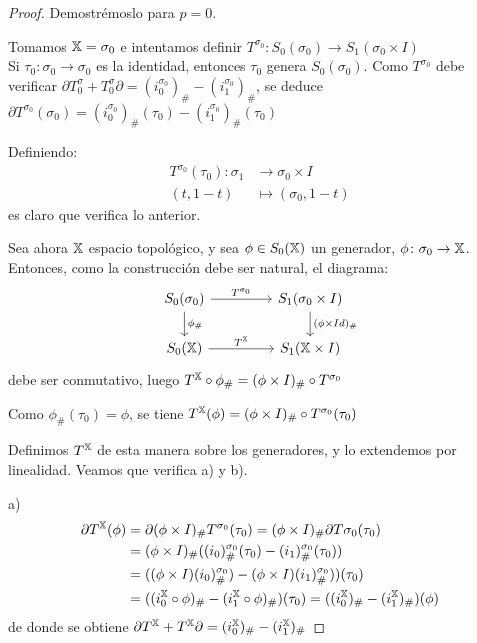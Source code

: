 \begin{proof}
  Demostrémoslo para $p = 0$.

  Tomamos ${\mathbb X} = \sigma_0$ e intentamos definir $T^{\sigma_0} \colon S_0(\sigma_0) \to S_1(\sigma_0 \times I)$ \\
  Si $\tau_0 \colon \sigma_0 \to \sigma_0$ es la identidad, entonces $\tau_0$ genera $S_0(\sigma_0)$. Como $T^{\sigma_0}$
  debe verificar $\partial T^\sigma_0 + T^\sigma_0 \partial = (i_0^{\sigma_0})_\# - (i_1^{\sigma_0})_\#$, se deduce
  $\partial T^{\sigma_0}(\sigma_0) = (i_0^{\sigma_0})_\# (\tau_0) - (i_1^{\sigma_0})_\# (\tau_0)$

  Definiendo:
  \begin{align*}
    T^{\sigma_0}(\tau_0) \colon \sigma_1 &\to \sigma_0 \times I \\
                       (t, 1-t) &\mapsto (\sigma_0, 1-t)
  \end{align*}
  es claro que verifica lo anterior.

  Sea ahora ${\mathbb X}$ espacio topológico, y sea $\phi \in S_0({\mathbb X})$ un generador, $\phi \colon \sigma_0 \to {\mathbb X}$.
  Entonces, como la construcción debe ser natural, el diagrama:
  \[
  \begin{tikzcd}
    S_0(\sigma_0) \arrow{r}{T^{\sigma_0}} \arrow{d}{\phi_\#} & [2em] S_1(\sigma_0 \times I) \arrow{d}{(\phi \times Id)_\#} \\
    \SX{0} \arrow{r}{T^\X}                 & S_1(\X \times I)
  \end{tikzcd}
  \]
  debe ser conmutativo, luego $T^{\mathbb X} \circ \phi_\# = (\phi \times I)_\# \circ T^{\sigma_0}$

  Como $\phi_\#(\tau_0) = \phi$, se tiene $T^{\mathbb X}(\phi) = (\phi \times I)_\# \circ T^{\sigma_0}(\tau_0)$

  Definimos $T^{\mathbb X}$ de esta manera sobre los generadores, y lo extendemos por linealidad. Veamos que verifica a) y b).

  a)
  \begin{align*}
    \partial T^{\mathbb X}(\phi) &= \partial(\phi \times I)_\# T^{\sigma_0}(\tau_0) = (\phi \times I)_\# \partial T{ \sigma_0}(\tau_0) \\
                        &= (\phi \times I)_\# ((i_0)_\#^{\sigma_0}(\tau_0) - (i_1)_\#^{\sigma_0}(\tau_0)) \\
                        &= ((\phi \times I) (i_0)_\#^{\sigma_0}) - (\phi \times I) (i_1)_\#^{\sigma_0}))(\tau_0) \\
                        &= ((i_0^{\mathbb X} \circ \phi)_\# - (i_1^{\mathbb X} \circ \phi)_\#) (\tau_0) = ((i_0^{\mathbb X})_\# - (i_1^{\mathbb X})_\#)(\phi)
  \end{align*}
  de donde se obtiene $\partial T^{\mathbb X} + T^{\mathbb X} \partial = (i_0^{\mathbb X})_\# - (i_1^{\mathbb X})_\#$


\end{proof}

